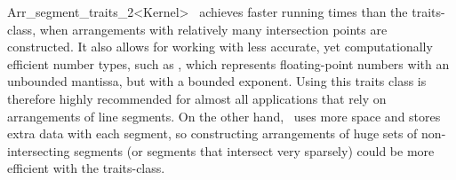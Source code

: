 \begin{ccRefClass}{Arr_segment_traits_2<Kernel>}
\ccRefName\ achieves faster running times than the
 traits-class, when
arrangements with relatively many intersection points are constructed.
It also allows for working with less accurate, yet computationally
efficient number types, such as , which
represents floating-point numbers with an unbounded mantissa, but with
a bounded exponent. Using this traits class is therefore highly recommended
for almost all applications that rely on arrangements of line segments.
On the other hand, \ccRefName\  uses more space and stores extra data with
each segment, so constructing arrangements of huge sets of non-intersecting
segments (or segments that intersect very sparsely) could be more efficient
with the  traits-class.

 
\ccIsModel
     \\

\end{ccRefClass}

\ccRefPageEnd
